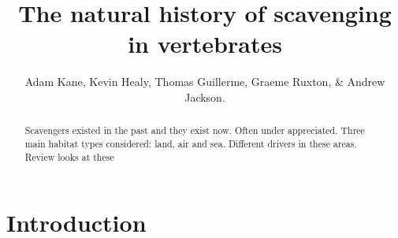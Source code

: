 \documentclass[a4paper,12pt]{article}
\title{The natural history of scavenging in vertebrates}
\author{Adam Kane, Kevin Healy, Thomas Guillerme, Graeme Ruxton, \& Andrew Jackson.}
\begin{document}
\maketitle


\begin{abstract}
 Scavengers existed in the past and they exist now. 
 Often under appreciated. 
 Three main habitat types considered: land, air and sea. 
 Different drivers in these areas. 
 Review looks at these 
\end{abstract}

\newpage


\section*{Introduction}
\end{document}
